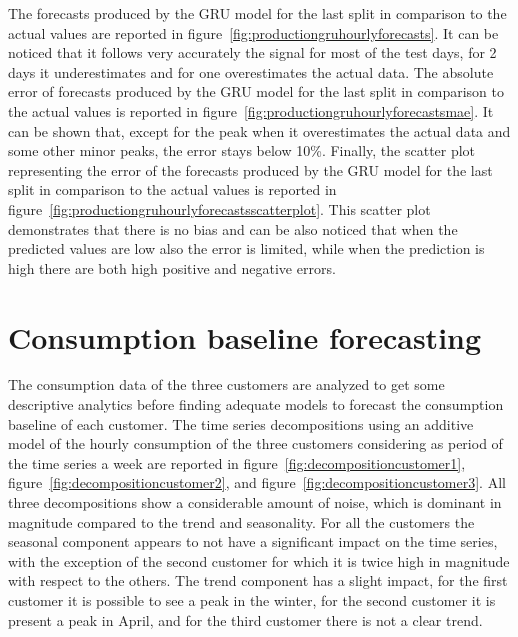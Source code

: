 The forecasts produced by the GRU model for the last split in comparison to the actual values are reported in figure~\ref{fig:productiongruhourlyforecasts}.
It can be noticed that it follows very accurately the signal for most of the test days, for 2 days it underestimates and for one overestimates the actual data.
The absolute error of forecasts produced by the GRU model for the last split in comparison to the actual values is reported in figure~\ref{fig:productiongruhourlyforecastsmae}.
It can be shown that, except for the peak when it overestimates the actual data and some other minor peaks, the error stays below 10\%.
Finally, the scatter plot representing the error of the forecasts produced by the GRU model for the last split in comparison to the actual values is reported in figure~\ref{fig:productiongruhourlyforecastsscatterplot}.
This scatter plot demonstrates that there is no bias and can be also noticed that when the predicted values are low also the error is limited, while when the prediction is high there are both high positive and negative errors.



\section{Consumption baseline forecasting} 
\label{sec:baselineval}
\vspace{0.2 cm}

The consumption data of the three customers are analyzed to get some descriptive analytics before finding adequate models to forecast the consumption baseline of each customer.
The time series decompositions using an additive model of the hourly consumption of the three customers considering as period of the time series a week are reported in figure~\ref{fig:decompositioncustomer1}, figure~\ref{fig:decompositioncustomer2}, and figure~\ref{fig:decompositioncustomer3}.
All three decompositions show a considerable amount of noise, which is dominant in magnitude compared to the trend and seasonality.
For all the customers the seasonal component appears to not have a significant impact on the time series, with the exception of the second customer for which it is twice high in magnitude with respect to the others.
The trend component has a slight impact, for the first customer it is possible to see a peak in the winter, for the second customer it is present a peak in April, and for the third customer there is not a clear trend.

